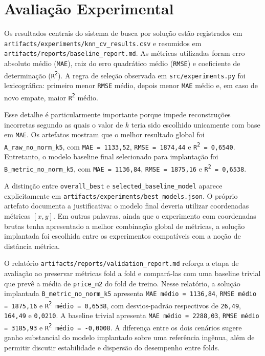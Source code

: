 \documentclass[12pt]{report}
\begin{document}
\chapter{Avaliação Experimental}

Os resultados centrais do sistema de busca por solução estão registrados em \texttt{artifacts/experiments/knn\_cv\_results.csv} e resumidos em \texttt{artifacts/reports/baseline\_report.md}. As métricas utilizadas foram erro absoluto médio (\texttt{MAE}), raiz do erro quadrático médio (\texttt{RMSE}) e coeficiente de determinação (\texttt{R\textsuperscript{2}}). A regra de seleção observada em \texttt{src/experiments.py} foi lexicográfica: primeiro menor \texttt{RMSE} médio, depois menor \texttt{MAE} médio e, em caso de novo empate, maior \texttt{R\textsuperscript{2}} médio.

Esse detalhe é particularmente importante porque impede reconstruções incorretas segundo as quais o valor de $k$ teria sido escolhido unicamente com base em \texttt{MAE}. Os artefatos mostram que o melhor resultado global foi \texttt{A\_raw\_no\_norm\_k5}, com \texttt{MAE = 1133,52}, \texttt{RMSE = 1874,44} e \texttt{R\textsuperscript{2} = 0,6540}. Entretanto, o modelo baseline final selecionado para implantação foi \texttt{B\_metric\_no\_norm\_k5}, com \texttt{MAE = 1136,84}, \texttt{RMSE = 1875,16} e \texttt{R\textsuperscript{2} = 0,6538}.

A distinção entre \texttt{overall\_best} e \texttt{selected\_baseline\_model} aparece explicitamente em \texttt{artifacts/experiments/best\_models.json}. O próprio artefato documenta a justificativa: o modelo final deveria utilizar coordenadas métricas $[x,y]$. Em outras palavras, ainda que o experimento com coordenadas brutas tenha apresentado a melhor combinação global de métricas, a solução implantada foi escolhida entre os experimentos compatíveis com a noção de distância métrica.

O relatório \texttt{artifacts/reports/validation\_report.md} reforça a etapa de avaliação ao preservar métricas fold a fold e compará-las com uma baseline trivial que prevê a média de \texttt{price\_m2} do fold de treino. Nesse relatório, a solução implantada \texttt{B\_metric\_no\_norm\_k5} apresenta \texttt{MAE médio = 1136,84}, \texttt{RMSE médio = 1875,16} e \texttt{R\textsuperscript{2} médio = 0,6538}, com desvios-padrão respectivos de \texttt{26,49}, \texttt{164,49} e \texttt{0,0210}. A baseline trivial apresenta \texttt{MAE médio = 2288,03}, \texttt{RMSE médio = 3185,93} e \texttt{R\textsuperscript{2} médio = -0,0008}. A diferença entre os dois cenários sugere ganho substancial do modelo implantado sobre uma referência ingênua, além de permitir discutir estabilidade e dispersão do desempenho entre folds.
\end{document}
